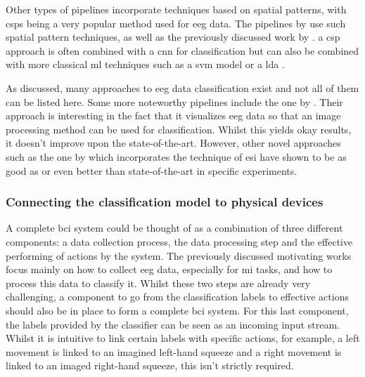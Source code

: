 Other types of pipelines incorporate techniques based on spatial patterns, with \glspl{csp} being a very popular method used for \gls{eeg} data.
The pipelines by \citet{eeg_mi_model_lda_csp, eeg_mi_model_deep_cnn_spatial_filters} use such spatial pattern techniques, as well as the previously discussed work by \citet{cheap_bci_feasibility}.
a \gls{csp} approach is often combined with a \gls{cnn} for classification but can also be combined with more classical \gls{ml} techniques such as a \gls{svm} model or a \gls{lda} \citep{eeg_mi_model_lda_csp}.

As discussed, many approaches to \gls{eeg} data classification exist and not all of them can be listed here.
Some more noteworthy pipelines include the one by \citet{eeg_mi_model_image_based}.
Their approach is interesting in the fact that it visualizes \gls{eeg} data so that an image processing method can be used for classification.
Whilst this yields okay results, it doesn't improve upon the state-of-the-art.
However, other novel approaches such as the one by \citet{eeg_model_esi} which incorporates the technique of \gls{esi} have shown to be as good as or even better than state-of-the-art in specific experiments.




\subsubsection{Connecting the classification model to physical devices}
\label{subsubsec:bci_small_projects_motivating_examples_physical_devices}

A complete \gls{bci} system could be thought of as a combination of three different components: a data collection process, the data processing step and the effective performing of actions by the system.
The previously discussed motivating works focus mainly on how to collect \gls{eeg} data, especially for \gls{mi} tasks, and how to process this data to classify it.
Whilst these two steps are already very challenging, a component to go from the classification labels to effective actions should also be in place to form a complete \gls{bci} system.
For this last component, the labels provided by the classifier can be seen as an incoming input stream.
Whilst it is intuitive to link certain labels with specific actions, for example, a left movement is linked to an imagined left-hand squeeze and a right movement is linked to an imaged right-hand squeeze, this isn't strictly required.

